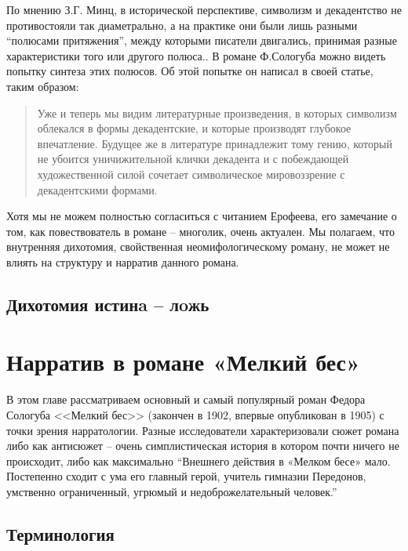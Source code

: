 \documentclass[12pt,a4paper]{article}
\begin{document}
По мнению З.Г. Минц, в исторической перспективе, символизм и декадентство не противостояли так диаметрально, а на практике они были лишь разными \enquote{полюсами притяжения}, между которыми писатели двигались, принимая разные характеристики того или другого полюса.\parencite[62]{mints2004}. В романе Ф.Сологуба можно видеть попытку синтеза этих полюсов. Об этой попытке он написал в своей статье, таким образом:

\begin{quote}
Уже и теперь мы видим литературные произведения, в которых символизм облекался в формы декадентские, и которые производят глубокое впечатление. Будущее же в литературе принадлежит тому гению, который не убоится уничижительной клички декадента и с побеждающей художественной силой сочетает символическое мировоззрение с декадентскими формами.
\parencite[501.]{ref:sologub2007}
\end{quote}


Хотя мы не можем полностью согласиться с читанием Ерофеева, его замечание о том, как повествователь в романе – многолик, очень актуален. Мы полагаем, что внутренняя дихотомия, свойственная неомифологическому роману, не может не влиять на структуру и нарратив данного романа. 

\subsection{Дихотомия истинa – лoжь}
\section{Нарратив в романе «Мелкий бес»}

В этом главе рассматриваем основный и самый популярный роман Федора Сологуба <<Мелкий бес>> (закончен в 1902, впервые опубликован в 1905) с точки зрения нарратологии. Разные исследователи характеризовали сюжет романа либо как антисюжет -- очень симплистическая история в котором почти ничего не происходит, либо как максимально  
\enquote{Внешнего действия в «Мелком бесе» мало. Постепенно сходит с ума его главный герой, учитель гимназии Передонов, умственно ограниченный, угрюмый и недоброжелательный человек.}
\autocite[432.]{grigorjev1983}


\subsection{Терминология}
\end{document}
